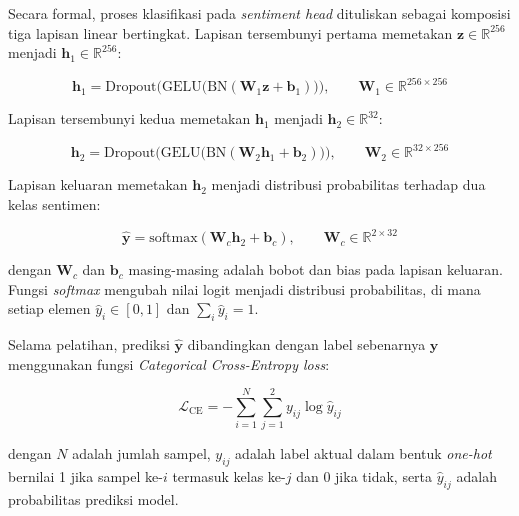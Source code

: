 \noindent Secara formal, proses klasifikasi pada \textit{sentiment head}
dituliskan sebagai komposisi tiga lapisan linear bertingkat. Lapisan
tersembunyi pertama memetakan $\mathbf{z} \in \mathbb{R}^{256}$ menjadi
$\mathbf{h}_1 \in \mathbb{R}^{256}$:

\begin{equation}
    \mathbf{h}_1 = \text{Dropout}\Big(\text{GELU}\big(\text{BN}
    (\mathbf{W}_1 \mathbf{z} + \mathbf{b}_1)\big)\Big),
    \qquad \mathbf{W}_1 \in \mathbb{R}^{256 \times 256}
    \label{eq:sentiment_h1}
\end{equation}

\noindent Lapisan tersembunyi kedua memetakan $\mathbf{h}_1$ menjadi
$\mathbf{h}_2 \in \mathbb{R}^{32}$:

\begin{equation}
    \mathbf{h}_2 = \text{Dropout}\Big(\text{GELU}\big(\text{BN}
    (\mathbf{W}_2 \mathbf{h}_1 + \mathbf{b}_2)\big)\Big),
    \qquad \mathbf{W}_2 \in \mathbb{R}^{32 \times 256}
    \label{eq:sentiment_h2}
\end{equation}

\noindent Lapisan keluaran memetakan $\mathbf{h}_2$ menjadi distribusi
probabilitas terhadap dua kelas sentimen:

\begin{equation}
    \hat{\mathbf{y}} = \text{softmax}\!\left(\mathbf{W}_c \mathbf{h}_2
    + \mathbf{b}_c\right), \qquad \mathbf{W}_c \in \mathbb{R}^{2 \times 32}
    \label{eq:sentiment_cls}
\end{equation}

\noindent dengan $\mathbf{W}_c$ dan $\mathbf{b}_c$ masing-masing adalah
bobot dan bias pada lapisan keluaran. Fungsi \textit{softmax} mengubah
nilai logit menjadi distribusi probabilitas, di mana setiap elemen
$\hat{y}_i \in [0, 1]$ dan $\sum_i \hat{y}_i = 1$.

Selama pelatihan, prediksi $\hat{\mathbf{y}}$ dibandingkan dengan label
sebenarnya $\mathbf{y}$ menggunakan fungsi \textit{Categorical Cross-Entropy loss}:

\begin{equation}
    \mathcal{L}_{\text{CE}} = -\sum_{i=1}^{N} \sum_{j=1}^{2}
    y_{ij} \log \hat{y}_{ij}
    \label{eq:ce_loss}
\end{equation}

\noindent dengan $N$ adalah jumlah sampel, $y_{ij}$ adalah label aktual
dalam bentuk \textit{one-hot} bernilai 1 jika sampel ke-$i$ termasuk
kelas ke-$j$ dan 0 jika tidak, serta $\hat{y}_{ij}$ adalah probabilitas
prediksi model.

